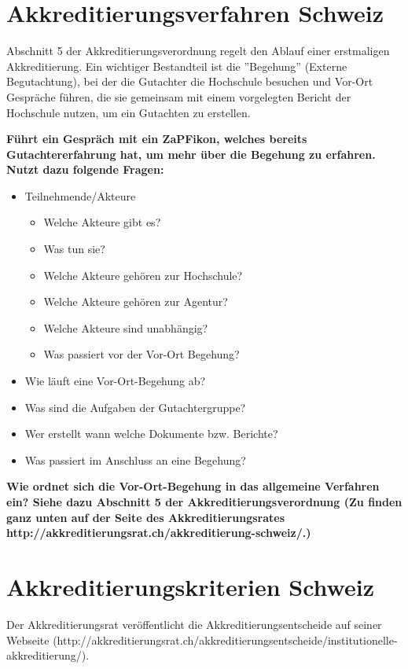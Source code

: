 \documentclass{scrartcl}
\begin{document}
\newpage
\section*{Akkreditierungsverfahren Schweiz}
Abschnitt 5 der Akkreditierungsverordnung regelt den Ablauf einer erstmaligen Akkreditierung. Ein wichtiger Bestandteil ist die ''Begehung'' (Externe Begutachtung), bei der die Gutachter die Hochschule besuchen und Vor-Ort Gespräche führen, die sie gemeinsam mit einem vorgelegten Bericht der Hochschule nutzen, um ein Gutachten zu erstellen.

\vspace{0.5cm}

\textbf{Führt ein Gespräch mit ein ZaPFikon, welches bereits Gutachtererfahrung hat, um mehr über die Begehung zu erfahren. Nutzt dazu folgende Fragen: }

\begin{itemize}
\item Teilnehmende/Akteure
	\begin{itemize}
		\item Welche Akteure gibt es?
		\item Was tun sie?
		\item Welche Akteure gehören zur Hochschule?
		\item Welche Akteure gehören zur Agentur?
		\item Welche Akteure sind unabhängig?
		\item Was passiert vor der Vor-Ort Begehung?
	\end{itemize}
\item Wie läuft eine Vor-Ort-Begehung ab?
\item Was sind die Aufgaben der Gutachtergruppe?
\item Wer erstellt wann welche Dokumente bzw. Berichte?
\item Was passiert im Anschluss an eine Begehung?
\end{itemize}

\textbf{Wie ordnet sich die Vor-Ort-Begehung in das allgemeine Verfahren ein? Siehe dazu Abschnitt 5 der Akkreditierungsverordnung (Zu finden ganz unten auf der Seite des Akkreditierungsrates\\
http://akkreditierungsrat.ch/akkreditierung-schweiz/.)}

\newpage
\section*{Akkreditierungskriterien Schweiz}
Der Akkreditierungsrat veröffentlicht die Akkreditierungsentscheide auf seiner Webseite (http://akkreditierungsrat.ch/akkreditierungsentscheide/institutionelle-akkreditierung/).\\
\end{document}
